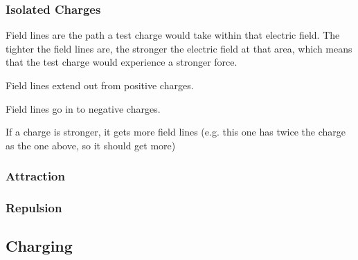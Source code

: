 \documentclass[../main.tex]{subfiles}
\begin{document}
		\subsubsection{Isolated Charges}
		Field lines are the path a test charge would take within that electric field. The tighter the field lines are, the stronger the electric field at that area, which means that the test charge would experience a stronger force.
		\begin{center}
		\end{center}
		Field lines extend out from positive charges.
		\begin{center}
		\end{center}
		Field lines go in to negative charges.
		
		If a charge is stronger, it gets more field lines (e.g. this one has twice the charge as the one above, so it should get more)
		\begin{center}
		\end{center}
		
		\subsubsection{Attraction}
		
		\subsubsection{Repulsion}
		
		\subsection{Charging}
\end{document}
